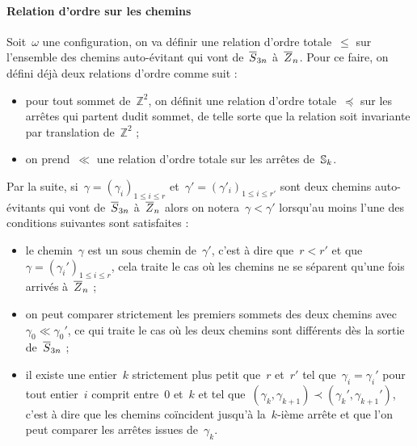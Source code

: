 		\paragraph{Relation d'ordre sur les chemins}
			Soit~$\omega$ une configuration, on va définir une relation d'ordre totale~$\leq$ sur l'ensemble des chemins auto-évitant qui vont de~$\overline{S}_{3n}$ à~$\overline{Z}_{n}$. Pour ce faire, on défini déjà deux relations d'ordre comme suit :
			\begin{itemize}
				\item pour tout sommet de~$\mathbb{Z}^2$, on définit une relation d'ordre totale~$\preceq$ \marginnote{$\preceq$} sur les arrêtes qui partent dudit sommet, de telle sorte que la relation soit invariante par translation de~$\mathbb{Z}^2$ ;
				\item on prend~$\ll$ \marginnote{$\ll$} une relation d'ordre totale sur les arrêtes de~$\mathbb{S}_k$.
			\end{itemize}
			Par la suite, si~$\gamma = \left(\gamma_i\right)_{1\leq i\leq r}$ et~$\gamma'=\left(\gamma'_i\right)_{1\leq i\leq r'}$ sont deux chemins auto-évitants qui vont de~$\overline{S}_{3n}$ à~$\overline{Z}_{n}$ alors on notera~$\gamma <\gamma'$ \marginnote{$\leq$} lorsqu'au moins l'une des conditions suivantes sont satisfaites :
			\begin{itemize}
				\item le chemin~$\gamma$ est un sous chemin de~$\gamma'$, c'est à dire que~$r<r'$ et que~$\gamma = \left(\gamma_i'\right)_{1\leq i\leq r}$, cela traite le cas où les chemins ne se séparent qu'une fois arrivés à~$\overline{Z}_{n}$ ;
				\item on peut comparer strictement les premiers sommets des deux chemins avec~$\gamma_0 \ll \gamma_0'$, ce qui traite le cas où les deux chemins sont différents dès la sortie de~$\overline{S}_{3n}$ ;
				\item il existe une entier~$k$ strictement plus petit que~$r$ et~$r'$ tel que~$\gamma_i=\gamma_i'$ pour tout entier~$i$ comprit entre~$0$ et~$k$ et tel que~$(\gamma_k,\gamma_{k+1}) \prec (\gamma_k',\gamma_{k+1}')$, c'est à dire que les chemins coïncident jusqu'à la~$k$-ième arrête et que l'on peut comparer les arrêtes issues de~$\gamma_k$.
		\end{itemize}
